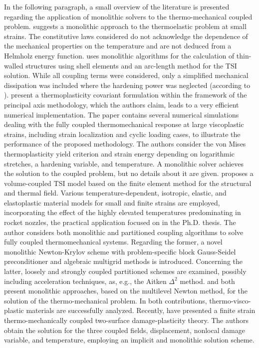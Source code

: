 In the following paragraph, a small overview of the literature is presented regarding the application of monolithic solvers to the thermo-mechanical coupled problem.
\cite{carter_finite_1989} suggests a monolithic approach to the thermoelastic problem at small strains.
The constitutive laws considered do not acknowledge the dependence of the mechanical properties on the temperature and are not deduced from a Helmholz energy function.
\cite{glaser_gekoppelte_1992} uses monolithic algorithms for the calculation of thin-walled structures using shell elements and an arc-length method for the TSI solution.
While all coupling terms were considered, only a simplified mechanical dissipation was included where the hardening power was neglected (according to \cite{danowski_computational_2014}).
\cite{ibrahimbegovic_covariant_2002} present a thermoplasticity covariant formulation within the framework of the principal axis methodology, which the authors claim, leads to a very efficient numerical implementation.
The paper contains several numerical simulations dealing with the fully coupled thermomechanical response at large viscoplastic strains, including strain localization and cyclic loading cases, to illustrate the performance of the proposed methodology.
The authors consider the von Mises thermoplasticity yield criterion and strain energy depending on logarithmic stretches, a hardening variable, and temperature.
A monolithic solver achieves the solution to the coupled problem, but no details about it are given.
\cite{danowski_computational_2014} proposes a volume-coupled TSI model based on the finite element method for the structural and thermal field.
Various temperature-dependent, isotropic, elastic, and elastoplastic material models for small and finite strains are employed, incorporating the effect of the highly elevated temperatures predominating in rocket nozzles, the practical application focused on in the Ph.D. thesis.
The author considers both monolithic and partitioned coupling algorithms to solve fully coupled thermomechanical systems.
Regarding the former,  a novel monolithic Newton-Krylov scheme with problem-specific block Gauss-Seidel preconditioner and algebraic multigrid methods is introduced.
Concerning the latter, loosely and strongly coupled partitioned schemes are examined, possibly including acceleration techniques, as, e.g., the Aitken \(\Delta^2\) method.
\cite{netz_high-order_2013} and \cite{rothe_monolithic_2015} both present monolithic approaches, based on the multilevel Newton method, for the solution of the thermo-mechanical problem.
In both contributions, thermo-visco-plastic materials are successfully analyzed.
Recently, \cite{felder_thermo-mechanically_2021} have presented a finite strain thermo-mechanically coupled two-surface damage-plasticity theory.
The authors obtain the solution for the three coupled fields, displacement, nonlocal damage variable, and temperature, employing an implicit and monolithic solution scheme.

